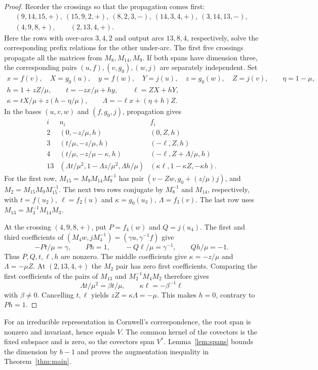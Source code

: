 \begin{proof}
Reorder the crossings so that the propagation comes first:
\[
\begin{gathered}
 (9,14,15,+),\ (15,9,2,+),\ (8,2,3,-),\
 (14,3,4,+),\ (3,14,13,-),\\
 (4,9,8,+),\qquad (2,13,4,+).
\end{gathered}
\]
Here the rows with over-arcs \(3,4,2\) and output arcs
\(13,8,4\), respectively, solve the corresponding prefix relations
for the other under-arc. The first five crossings propagate all the
matrices from \(M_8,M_{14},M_9\). If both spans have dimension three,
the corresponding pairs \((u,f),(v,g_0),(w,j)\)
are separately independent. Set
\[
\begin{gathered}
 x=f(v),\quad X=g_0(u),\quad y=f(w),\quad Y=j(u),\quad
 z=g_0(w),\quad Z=j(v),\qquad \eta=1-\mu,\\
 h=1+zZ/\mu,\qquad t=-zx/\mu+hy,\qquad \ell=ZX+hY,\\
 \kappa=tX/\mu+z(h-\eta/\mu),\qquad
 \Lambda=-\ell x+(\eta+h)Z .
\end{gathered}
\]
In the bases \((u,v,w)\) and \((f,g_0,j)\), propagation gives
\[
\begin{array}{c|cc}
 i&u_i&f_i\\\hline
 2&(0,-z/\mu,h)&(0,Z,h)\\
 3&(t/\mu,-z/\mu,h)&(-\ell,Z,h)\\
 4 &(t/\mu,-z/\mu-\kappa,h)&(-\ell,Z+\Lambda/\mu,h)\\
 13&(\Lambda t/\mu^2,1-\Lambda z/\mu^2,\Lambda h/\mu)
       &(\kappa\ell,1-\kappa Z,-\kappa h).
\end{array}
\]
For the first row, \(M_{15}=M_{9}M_{14}M_{9}^{-1}\) has pair
\((v-Zw,g_0+(z/\mu)j)\), and \(M_{2}=M_{15}M_{9}M_{15}^{-1}\).
The next two rows conjugate by \(M_{8}^{-1}\) and \(M_{14}\),
respectively, with \(t=f(u_{2}),\ \ell=f_{2}(u)\) and
\(\kappa=g_0(u_{3}),\ \Lambda=f_{3}(v)\).
The last row uses \(M_{13}=M_{3}^{-1}M_{14}M_{3}\).

At the crossing \((4,9,8,+)\), put \(P=f_{4}(w)\) and
\(Q=j(u_{4})\). The first and third coefficients of
\((M_{4}w,jM_{4}^{-1})=(\gamma u,\gamma^{-1}f)\) give
\[
 -Pt/\mu=\gamma,\qquad Ph=1,\qquad
 -Q\ell/\mu=\gamma^{-1},\qquad Qh/\mu=-1.
\]
Thus \(P,Q,t,\ell,h\) are nonzero. The middle coefficients
give \(\kappa=-z/\mu\) and \(\Lambda=-\mu Z\).
At \((2,13,4,+)\) the \(M_{2}\) pair has zero first
coefficients. Comparing the first coefficients of the pairs
of \(M_{13}\) and \(M_{2}^{-1}M_{4}M_{2}\) therefore gives
\[
 \Lambda t/\mu^2=\beta t/\mu,\qquad
 \kappa\ell=-\beta^{-1}\ell
\]
with \(\beta\ne0\). Cancelling \(t,\ell\) yields
\(zZ=\kappa\Lambda=-\mu\). This makes \(h=0\), contrary to
\(Ph=1\).
\end{proof}

For an irreducible representation in Cornwell's correspondence,
the root span is nonzero and invariant, hence equals \(V\).
The common kernel of the covectors is the fixed subspace and
is zero, so the covectors span \(V^*\).
Lemma~\ref{lem:spans} bounds the dimension by \(b-1\) and
proves the augmentation inequality in Theorem~\ref{thm:main}.
